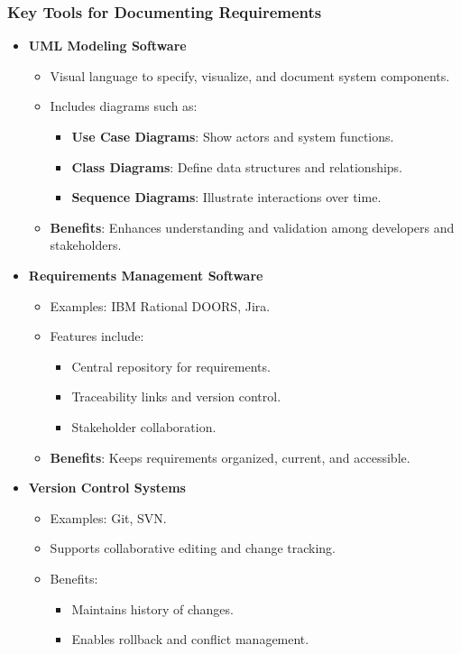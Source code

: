 \documentclass{beamer}
\begin{document}
\begin{frame}[fragile]
    \frametitle{Key Tools for Documenting Requirements}
    \begin{itemize}
        \item \textbf{UML Modeling Software}
        \begin{itemize}
            \item Visual language to specify, visualize, and document system components.
            \item Includes diagrams such as:
            \begin{itemize}
                \item \textbf{Use Case Diagrams}: Show actors and system functions.
                \item \textbf{Class Diagrams}: Define data structures and relationships.
                \item \textbf{Sequence Diagrams}: Illustrate interactions over time.
            \end{itemize}
            \item \textbf{Benefits}: Enhances understanding and validation among developers and stakeholders.
        \end{itemize}
        \item \textbf{Requirements Management Software}
        \begin{itemize}
            \item Examples: IBM Rational DOORS, Jira.
            \item Features include:
            \begin{itemize}
                \item Central repository for requirements.
                \item Traceability links and version control.
                \item Stakeholder collaboration.
            \end{itemize}
            \item \textbf{Benefits}: Keeps requirements organized, current, and accessible.
        \end{itemize}
        \item \textbf{Version Control Systems}
        \begin{itemize}
            \item Examples: Git, SVN.
            \item Supports collaborative editing and change tracking.
            \item Benefits:
            \begin{itemize}
                \item Maintains history of changes.
                \item Enables rollback and conflict management.
            \end{itemize}
        \end{itemize}
    \end{itemize}
\end{frame}
\end{document}
